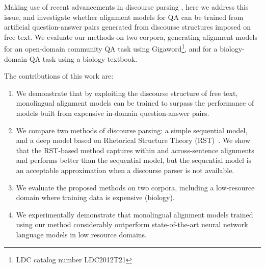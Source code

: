 Making use of recent advancements in discourse parsing \cite{feng12}, here we address this issue, and investigate whether alignment models for QA can be trained from artificial question-answer pairs generated from discourse structures imposed on free text.
We evaluate our methods on two corpora, generating alignment models for an open-domain  community QA task using Gigaword\footnote{LDC catalog number LDC2012T21}, and for a biology-domain QA task using a biology textbook. 

The contributions of this work are:
\begin{enumerate}
\item We demonstrate that by exploiting the discourse structure of free text, monolingual alignment models can be trained to surpass the performance of models built from expensive in-domain question-answer pairs. 
\item We compare two methods of discourse parsing: a simple sequential model, and a deep model based on Rhetorical Structure Theory (RST)~\cite{mann88}.  We show that the RST-based method captures within and across-sentence alignments and performs better than the sequential model, but the sequential model is an acceptable approximation when a discourse parser is not available.  
\item We evaluate the proposed methods on two corpora, including a low-resource domain where training data is expensive (biology).
\item We experimentally demonstrate that monolingual alignment models trained using our method considerably outperform state-of-the-art neural network language models in low resource domains.
\end{enumerate}











